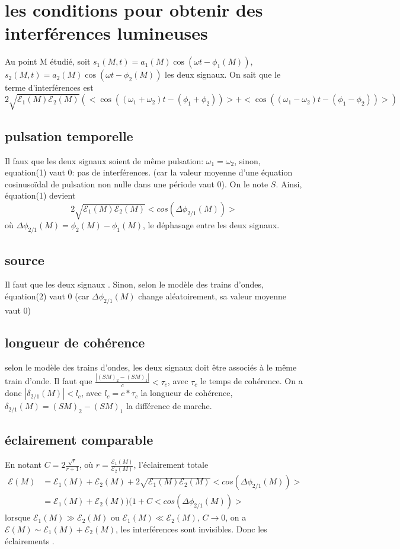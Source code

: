\documentclass[a4paper,12pt]{book}
\begin{document}
\renewcommand{\labelitemi}{$\blacktriangleright$}
\renewcommand{\labelitemii}{$\bullet$}

\section{les conditions pour obtenir des interférences lumineuses}
Au point M étudié, soit $s_1(M,t)=a_1(M)\cos(\omega t-\phi_1(M))$, $s_2(M,t)=a_2(M)\cos(\omega t-\phi_2(M))$ les deux signaux.
On sait que le terme d'interférences est 
\begin{equation}
2\sqrt{\mathcal{E}_1(M)\mathcal{E}_2(M)}(<\cos((\omega_1+\omega_2)t-(\phi_1+\phi_2))>+<\cos((\omega_1-\omega_2)t-(\phi_1-\phi_2))>) \label{e1}
\end{equation}
\subsection{pulsation temporelle}
Il faux que les deux signaux soient de même pulsation: $\boxed{\omega_1=\omega_2}$, sinon, equation(1) vaut $0$: pas de interférences.  
(car la valeur moyenne d'une équation cosinusoïdal de pulsation non nulle dans une période vaut $0$). On le note $S$.
Ainsi, équation(1) devient 
\begin{equation}
    2\sqrt{\mathcal{E}_1(M)\mathcal{E}_2(M)}<cos(\Delta\phi_{2/1}(M))>
\end{equation}
où $\Delta\phi_{2/1}(M)=\phi_2(M)-\phi_1(M)$, le déphasage entre les deux signaux. 
\subsection{source}
Il faut que les deux signaux . Sinon, selon le modèle des trains d'ondes, équation(2) vaut 0 (car 
$\Delta\phi_{2/1}(M)$ change aléatoirement, sa valeur moyenne vaut 0)
\subsection{longueur de cohérence}
selon le modèle des trains d'ondes, les deux signaux doit être associés à le même train d'onde. Il faut que 
$\frac{|(SM)_2-(SM)_1|}{c}<\tau_c$, avec $\tau_c$ le temps de cohérence. On a donc $\boxed{|\delta_{2/1}(M)|<l_c}$, avec
 $l_c=c*\tau_c$ la longueur de cohérence, $\delta_{2/1}(M)=(SM)_2-(SM)_1$ la différence de marche. 
\subsection{éclairement comparable}
En notant $C=2\frac{\sqrt{r}}{r+1}$, où $r=\frac{\mathcal{E}_1(M)}{\mathcal{E}_2(M)}$, l'éclairement totale 
\begin{align*}
    \mathcal{E}(M)&=\mathcal{E}_1(M)+\mathcal{E}_2(M)+2\sqrt{\mathcal{E}_1(M)\mathcal{E}_2(M)}<cos(\Delta\phi_{2/1}(M))>\\
                  &=\mathcal{E}_1(M)+\mathcal{E}_2(M))(1+C<cos(\Delta\phi_{2/1}(M))>
\end{align*}
lorsque $\mathcal{E}_1(M) \gg \mathcal{E}_2(M)$ ou $ \mathcal{E}_1(M)\ll \mathcal{E}_2(M)$, $C\rightarrow 0$, 
on a $\mathcal{E}(M)\sim \mathcal{E}_1(M)+\mathcal{E}_2(M)$, les interférences sont invisibles. Donc les éclairements . 
\end{document}
